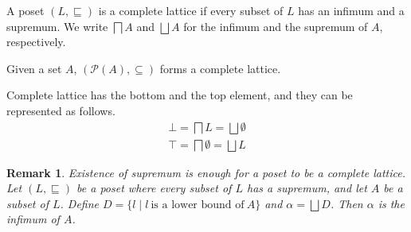 \documentclass[9pt]{beamer}
\newcommand\pow[1]{\mathcal{P}(#1)}
\newtheorem{remark}{Remark}
\begin{document}
\begin{frame}
  \begin{definition}
    A poset $(L, \sqsubseteq)$ is a complete lattice if
    every subset of $L$ has an infimum and a supremum.
    We write $\bigsqcap A$ and $\bigsqcup A$ for the infimum and the supremum of $A$, respectively.
  \end{definition}

  \begin{example}
    Given a set $A$, $(\pow{A}, \subseteq)$ forms a complete lattice.
  \end{example}

  \begin{lemma}
    Complete lattice has the bottom and the top element, and they can be represented as follows.
    $$
      \begin{aligned}
        \bot = \bigsqcap L         = \bigsqcup \emptyset \\
        \top = \bigsqcap \emptyset = \bigsqcup L
      \end{aligned}
    $$
  \end{lemma}

  \begin{remark}
    Existence of supremum is enough for a poset to be a complete lattice.
    Let $(L, \sqsubseteq)$ be a poset where every subset of $L$ has a supremum, and let $A$ be a subset of $L$.
    Define $D = \{l \mid l \ \text{is a lower bound of} \ A \}$ and $\alpha = \bigsqcup D$.
    Then $\alpha$ is the infimum of $A$.
  \end{remark}
\end{frame}
\end{document}
